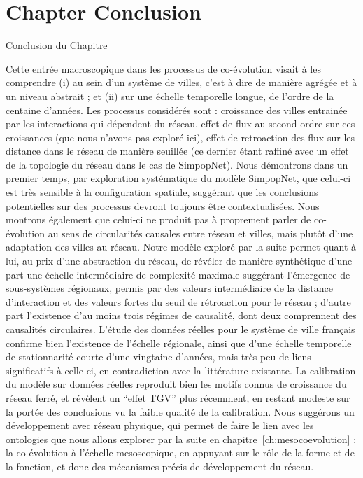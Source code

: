 

\newpage


\section*{Chapter Conclusion}{Conclusion du Chapitre}


Cette entrée macroscopique dans les processus de co-évolution visait à les comprendre (i) au sein d'un système de villes, c'est à dire de manière agrégée et à un niveau abstrait ; et (ii) sur une échelle temporelle longue, de l'ordre de la centaine d'années. Les processus considérés sont : croissance des villes entrainée par les interactions qui dépendent du réseau, effet de flux au second ordre sur ces croissances (que nous n'avons pas exploré ici), effet de retroaction des flux sur les distance dans le réseau de manière seuillée (ce dernier étant raffiné avec un effet de la topologie du réseau dans le cas de SimpopNet). Nous démontrons dans un premier temps, par exploration systématique du modèle SimpopNet, que celui-ci est très sensible à la configuration spatiale, suggérant que les conclusions potentielles sur des processus devront toujours être contextualisées. Nous montrons également que celui-ci ne produit pas à proprement parler de co-évolution au sens de circularités causales entre réseau et villes, mais plutôt d'une adaptation des villes au réseau. Notre modèle exploré par la suite permet quant à lui, au prix d'une abstraction du réseau, de révéler de manière synthétique d'une part une échelle intermédiaire de complexité maximale suggérant l'émergence de sous-systèmes régionaux, permis par des valeurs intermédiaire de la distance d'interaction et des valeurs fortes du seuil de rétroaction pour le réseau ; d'autre part l'existence d'au moins trois régimes de causalité, dont deux comprennent des causalités circulaires. L'étude des données réelles pour le système de ville français confirme bien l'existence de l'échelle régionale, ainsi que d'une échelle temporelle de stationnarité courte d'une vingtaine d'années, mais très peu de liens significatifs à celle-ci, en contradiction avec la littérature existante. La calibration du modèle sur données réelles reproduit bien les motifs connus de croissance du réseau ferré, et révèlent un ``effet TGV'' plus récemment, en restant modeste sur la portée des conclusions vu la faible qualité de la calibration. Nous suggérons un développement avec réseau physique, qui permet de faire le lien avec les ontologies que nous allons explorer par la suite en chapitre~\ref{ch:mesocoevolution} : la co-évolution à l'échelle mesoscopique, en appuyant sur le rôle de la forme et de la fonction, et donc des mécanismes précis de développement du réseau.



\stars
